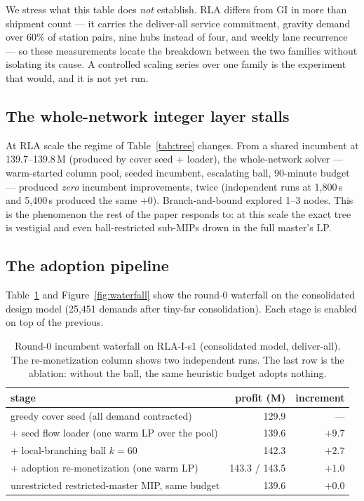 \documentclass[11pt]{article}
\begin{document}
We stress what this table does \emph{not} establish. RLA differs from GI in
more than shipment count --- it carries the deliver-all service commitment,
gravity demand over 60\% of station pairs, nine hubs instead of four, and
weekly lane recurrence --- so these measurements locate the breakdown
between the two families without isolating its cause. A controlled scaling
series over one family is the experiment that would, and it is not yet run.

\subsection{The whole-network integer layer stalls}\label{sec:results:root}

At RLA scale the regime of Table~\ref{tab:tree} changes. From a shared
incumbent at 139.7--139.8\,M (produced by cover seed + loader), the
whole-network solver --- warm-started column pool, seeded
incumbent, escalating ball, 90-minute budget --- produced \emph{zero}
incumbent improvements, twice (independent runs at 1{,}800\,s and
5{,}400\,s produced the same $+0$). Branch-and-bound explored 1--3 nodes.
This is the phenomenon the rest of the paper responds to: at this scale the
exact tree is vestigial and even ball-restricted sub-MIPs drown in the full
master's LP.

\subsection{The adoption pipeline}\label{sec:results:pipeline}

Table~\ref{tab:waterfall} and Figure~\ref{fig:waterfall} show the round-0 waterfall on the consolidated
design model (25{,}451 demands after tiny-far consolidation). Each stage is
enabled on top of the previous.

\begin{table}[t]
\centering\small
\begin{tabular}{lrr}
\toprule
stage & profit (M) & increment \\
\midrule
greedy cover seed (all demand contracted) & 129.9 & --- \\
+ seed flow loader (one warm LP over the pool) & 139.6 & $+9.7$ \\
+ local-branching ball $k{=}60$ & 142.3 & $+2.7$ \\
+ adoption re-monetization (one warm LP) & 143.3 / 143.5 & $+1.0$ \\
\midrule
unrestricted restricted-master MIP, same budget & 139.6 & $+0.0$ \\
\bottomrule
\end{tabular}
\caption{Round-0 incumbent waterfall on RLA-I-s1 (consolidated model,
deliver-all). The re-monetization column shows two
independent runs. The last row is the ablation: without the ball, the same
heuristic budget adopts nothing.}
\label{tab:waterfall}
\end{table}
\end{document}
